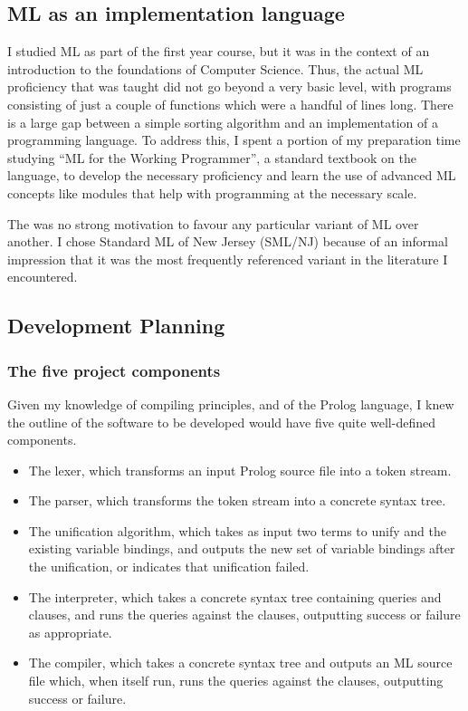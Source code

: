 \documentclass[12pt]{article}
\begin{document}
\subsection{ML as an implementation language}

I studied ML as part of the first year course, but it was in the context of an introduction to the foundations of Computer Science. 
Thus, the actual ML proficiency that was taught did not go beyond a very basic level, with programs consisting of just a couple of functions which were a handful of lines long. 
There is a large gap between a simple sorting algorithm and an implementation of a programming language. 
To address this, I spent a portion of my preparation time studying ``ML for the Working Programmer'', a standard textbook on the language, to develop the necessary proficiency and learn the use of advanced ML concepts like modules that help with programming at the necessary scale.

The was no strong motivation to favour any particular variant of ML over another.
I chose Standard ML of New Jersey (SML/NJ) because of an informal impression that it was the most frequently referenced variant in the literature I encountered.

\subsection{Development Planning}

\subsubsection{The five project components}

Given my knowledge of compiling principles, and of the Prolog language, I knew the outline of the software to be developed would have five quite well-defined components.

\begin{itemize}
\item The lexer, which transforms an input Prolog source file into a token stream.
\item The parser, which transforms the token stream into a concrete syntax tree.
\item The unification algorithm, which takes as input two terms to unify and the existing variable bindings, and outputs the new set of variable bindings after the unification, or indicates that unification failed.
\item The interpreter, which takes a concrete syntax tree containing queries and clauses, and runs the queries against the clauses, outputting success or failure as appropriate.
\item The compiler, which takes a concrete syntax tree and outputs an ML source file which, when itself run, runs the queries against the clauses, outputting success or failure.
\end{itemize}
\end{document}
